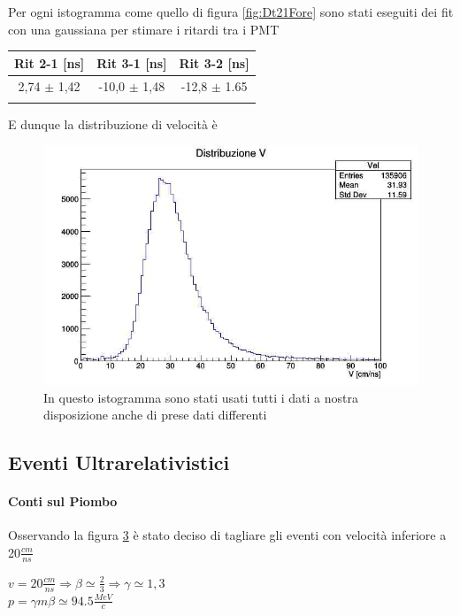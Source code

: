 \documentclass[a4paper]{article}
\begin{document}
\begin{figure}[H]
\begin{center}
\begin{subfigure}[b]{0.32\textwidth}
\caption{}
\label{fig:Dt32Fore}
\end{subfigure}
\end{center}
\end{figure}

Per ogni istogramma come quello di figura \ref{fig:Dt21Fore} sono stati eseguiti dei fit con una gaussiana per stimare i ritardi tra i PMT

\begin{tabular}{|c|c|c|}
\hline
Rit 2-1 [ns] & Rit 3-1 [ns] & Rit 3-2 [ns] \\
\hline
2,74 $\pm$ 1,42 & -10,0 $\pm$ 1,48 & -12,8 $\pm$ 1.65\\
\hline
\label{tab:RitFore}
\end{tabular}

E dunque la distribuzione di velocità è

\begin{figure}[H]
\centering
\includegraphics[scale=0.4]{./immagini/TimeOfFlight/VTripleFore.jpg}
\caption{In questo istogramma sono stati usati tutti i dati a nostra disposizione anche di prese dati differenti}
\label{fig:VFore}
\end{figure}

\subsection{Eventi Ultrarelativistici}
\label{sec:RapportoU-N}
\paragraph{Conti sul Piombo}
Osservando la figura \ref{fig:VFore} è stato deciso di tagliare gli eventi con velocità inferiore a 20$\frac{cm}{ns}$
\begin{center}
$v = 20\frac{cm}{ns} \Rightarrow \beta \simeq \frac{2}{3} \Rightarrow \gamma \simeq 1,3$ \\ $ p=\gamma m \beta \simeq 94.5 \frac{MeV}{c} $
\end{center}
\end{document}
